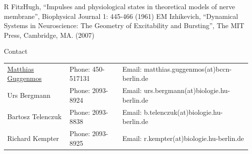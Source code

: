 \documentclass[12pt]{article}
\begin{document}
\begin{thebibliography}{7}
     R FitzHugh, ``Impulses and physiological states in theoretical models of nerve membrane'', Biophysical Journal 1: 445-466 (1961) 
     EM Izhikevich, ``Dynamical Systems in Neuroscience: The Geometry of Excitability and Bursting'', The MIT Press, Cambridge, MA. (2007)
\end{thebibliography}

\vfill
\centerline{\CAP Contact}
\CAP

\begin{tabular}{lll}
\underline{Matthias Guggenmos} & Phone: 450-517131 & Email: matthias.guggenmos(at)bccn-berlin.de \\
Urs Bergmann & Phone: 2093-8924 & Email: urs.bergmann(at)biologie.hu-berlin.de \\
Bartosz Telenczuk & Phone: 2093-8838 & Email: b.telenczuk(at)biologie.hu-berlin.de \\
Richard Kempter & Phone: 2093-8925 & Email: r.kempter(at)biologie.hu-berlin.de \\
\end{tabular}
\end{document}
